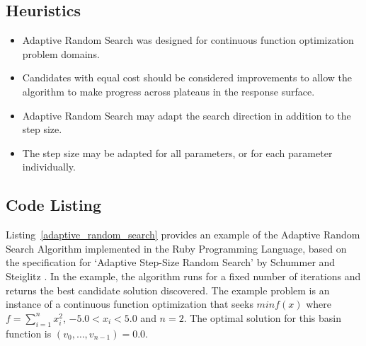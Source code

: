 \subsection{Heuristics}
\begin{itemize}
	\item Adaptive Random Search was designed for continuous function optimization problem domains.
	\item Candidates with equal cost should be considered improvements to allow the algorithm to make progress across plateaus in the response surface.
	\item Adaptive Random Search may adapt the search direction in addition to the step size.
	\item The step size may be adapted for all parameters, or for each parameter individually.
\end{itemize}

\subsection{Code Listing}
Listing~\ref{adaptive_random_search} provides an example of the Adaptive Random Search Algorithm implemented in the Ruby Programming Language, based on the specification for `Adaptive Step-Size Random Search' by Schummer and Steiglitz \cite{Schumer1968}. 
In the example, the algorithm runs for a fixed number of iterations and returns the best candidate solution discovered. 
The example problem is an instance of a continuous function optimization that seeks $min f(x)$ where $f=\sum_{i=1}^n x_{i}^2$, $-5.0 < x_i < 5.0$ and $n=2$. The optimal solution for this basin function is $(v_0,\ldots,v_{n-1})=0.0$.

